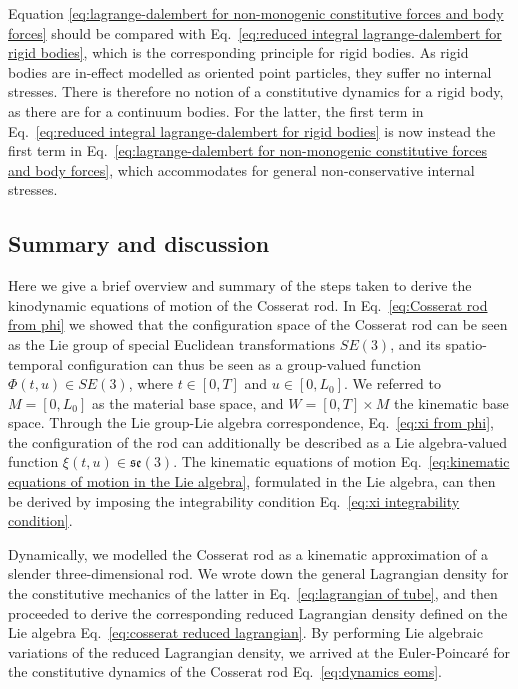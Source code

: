 Equation \ref{eq:lagrange-dalembert for non-monogenic constitutive forces and body forces} should be compared with Eq.~\ref{eq:reduced integral lagrange-dalembert for rigid bodies}, which is the corresponding principle for rigid bodies. As rigid bodies are in-effect modelled as oriented point particles, they suffer no internal stresses. There is therefore no notion of a constitutive dynamics for a rigid body, as there are for a continuum bodies. For the latter, the first term in Eq.~\ref{eq:reduced integral lagrange-dalembert for rigid bodies} is now instead the first term in Eq.~\ref{eq:lagrange-dalembert for non-monogenic constitutive forces and body forces}, which accommodates for general non-conservative internal stresses.


\subsection{Summary and discussion}

Here we give a brief overview and summary of the steps taken to derive the kinodynamic equations of motion of the Cosserat rod. In Eq.~\ref{eq:Cosserat rod from phi} we showed that the configuration space of the Cosserat rod can be seen as the Lie group of special Euclidean transformations $SE(3)$, and its spatio-temporal configuration can thus be seen as a group-valued function $\Phi(t,u) \in SE(3)$, where $t \in [0, T]$ and $u \in [0, L_0]$. We referred to $M = [0, L_0]$ as the material base space, and $W = [0, T] \times M$ the kinematic base space. Through the Lie group-Lie algebra correspondence, Eq.~\ref{eq:xi from phi}, the configuration of the rod can additionally be described as a Lie algebra-valued function $\xi(t,u) \in \mathfrak{se}(3)$. The kinematic equations of motion Eq.~\ref{eq:kinematic equations of motion in the Lie algebra}, formulated in the Lie algebra, can then be derived by imposing the integrability condition Eq.~\ref{eq:xi integrability condition}.

Dynamically, we modelled the Cosserat rod as a kinematic approximation of a slender three-dimensional rod. We wrote down the general Lagrangian density for the constitutive mechanics of the latter in Eq.~\ref{eq:lagrangian of tube}, and then proceeded to derive the corresponding reduced Lagrangian density defined on the Lie algebra Eq.~\ref{eq:cosserat reduced lagrangian}. By performing Lie algebraic variations of the reduced Lagrangian density, we arrived at the Euler-Poincaré for the constitutive dynamics of the Cosserat rod Eq.~\ref{eq:dynamics eoms}.

